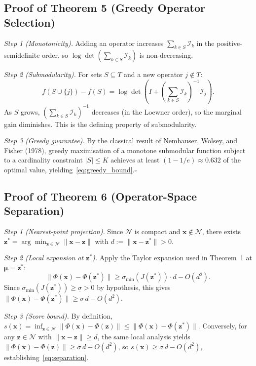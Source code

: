 \documentclass[journal]{IEEEtran}
\begin{document}
\subsection{Proof of Theorem 5 (Greedy Operator Selection)}

\textit{Step 1 (Monotonicity).}
Adding an operator increases $\sum_{k\in S}\mathcal{I}_k$ in the positive-semidefinite order, so $\log\det(\sum_{k\in S}\mathcal{I}_k)$ is non-decreasing.

\textit{Step 2 (Submodularity).}
For sets $S\subseteq T$ and a new operator $j\notin T$:
\[
f(S\cup\{j\})-f(S) = \log\det(I + (\textstyle\sum_{k\in S}\mathcal{I}_k)^{-1}\mathcal{I}_j).
\]
As $S$ grows, $(\sum_{k\in S}\mathcal{I}_k)^{-1}$ decreases (in the Loewner order), so the marginal gain diminishes.  This is the defining property of submodularity.

\textit{Step 3 (Greedy guarantee).}
By the classical result of Nemhauser, Wolsey, and Fisher (1978), greedy maximisation of a monotone submodular function subject to a cardinality constraint $|S|\leq K$ achieves at least $(1-1/e)\approx 0.632$ of the optimal value, yielding~\eqref{eq:greedy_bound}.\hfill$\square$

\subsection{Proof of Theorem 6 (Operator-Space Separation)}

\textit{Step 1 (Nearest-point projection).}
Since $\mathcal{N}$ is compact and $\mathbf{x}\notin\mathcal{N}$, there exists $\mathbf{z}^*=\arg\min_{\mathbf{z}\in\mathcal{N}}\|\mathbf{x}-\mathbf{z}\|$ with $d:=\|\mathbf{x}-\mathbf{z}^*\|>0$.

\textit{Step 2 (Local expansion at $\mathbf{z}^*$).}
Apply the Taylor expansion used in Theorem~1 at $\boldsymbol{\mu}=\mathbf{z}^*$:
\[
\|\Phi(\mathbf{x})-\Phi(\mathbf{z}^*)\| \geq \sigma_{\min}(J(\mathbf{z}^*))\cdot d - O(d^2).
\]
Since $\sigma_{\min}(J(\mathbf{z}^*))\geq\underline{\sigma}>0$ by hypothesis, this gives $\|\Phi(\mathbf{x})-\Phi(\mathbf{z}^*)\|\geq\underline{\sigma}\,d-O(d^2)$.

\textit{Step 3 (Score bound).}
By definition, $s(\mathbf{x})=\inf_{\mathbf{z}\in\mathcal{N}}\|\Phi(\mathbf{x})-\Phi(\mathbf{z})\|\leq\|\Phi(\mathbf{x})-\Phi(\mathbf{z}^*)\|$.  Conversely, for any $\mathbf{z}\in\mathcal{N}$ with $\|\mathbf{x}-\mathbf{z}\|\geq d$, the same local analysis yields $\|\Phi(\mathbf{x})-\Phi(\mathbf{z})\|\geq\underline{\sigma}\,d-O(d^2)$, so $s(\mathbf{x})\geq\underline{\sigma}\,d-O(d^2)$, establishing~\eqref{eq:separation}.
\end{document}
